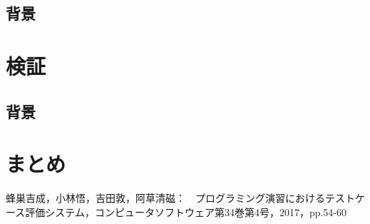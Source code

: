 \documentclass{tpu-sotu}
\begin{document}
\section{背景}
\chapter{検証}
\section{背景}
\chapter{まとめ}
\acknowledgements
\begin{thebibliography}{1}
    蜂巣吉成，小林悟，吉田敦，阿草清磁：　プログラミング演習におけるテストケース評価システム，コンピュータソフトウェア第34巻第4号，2017，pp.54-60
\end{thebibliography}
\end{document}
